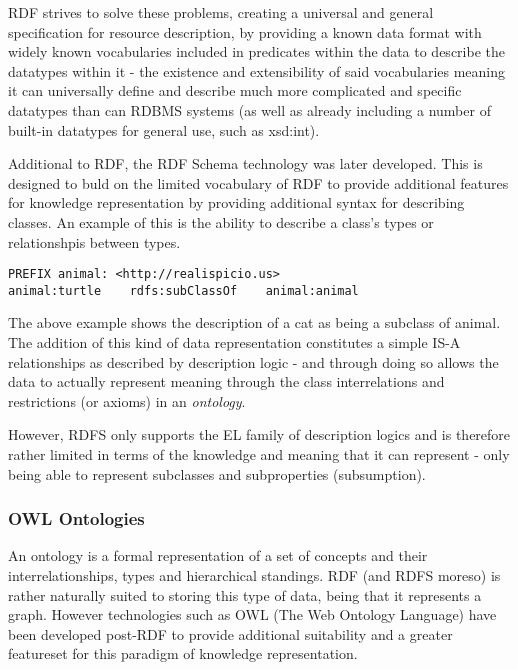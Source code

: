 \documentclass{article}
\begin{document}
RDF strives to solve these problems, creating a universal and general
specification for resource description, by providing a known data format with
widely known vocabularies included in predicates within the data to describe 
the datatypes within it - the existence and extensibility of said vocabularies 
meaning it can universally define and describe much more complicated and 
specific datatypes than can RDBMS systems (as well as already including a number
of built-in datatypes for general use, such as xsd:int).

Additional to RDF, the RDF Schema\cite{rdfs} technology was later developed. This is
designed to buld on the limited vocabulary of RDF to provide additional features
for knowledge representation by providing additional syntax for describing
classes. An example of this is the ability to describe a class's types or
relationshpis between types.

\begin{lstlisting}
PREFIX animal: <http://realispicio.us>
animal:turtle    rdfs:subClassOf    animal:animal
\end{lstlisting}

The above example shows the description of a cat as being a subclass of animal.
The addition of this kind of data representation constitutes a simple IS-A
relationships as described by description logic\cite{desclogic} - and through 
doing so allows the data to actually represent meaning through the class 
interrelations and restrictions (or axioms) in an \emph{ontology}.

However, RDFS only supports the EL family of description logics and is therefore
rather limited in terms of the knowledge and meaning that it can represent -
only being able to represent subclasses and subproperties (subsumption).

\subsubsection{OWL Ontologies}

An ontology\cite{ontology} is a formal representation of a set of concepts and their
interrelationships, types and hierarchical standings. RDF (and RDFS moreso) is
rather naturally suited to storing this type of data, being that it represents 
a graph. However technologies such as OWL (The Web Ontology Language) have been 
developed post-RDF to provide additional suitability and a greater featureset 
for this paradigm of knowledge representation.
\end{document}
